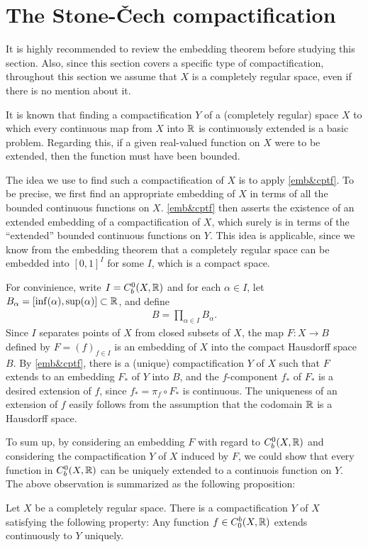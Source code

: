 \section{The Stone-\v{C}ech compactification}

It is highly recommended to review the embedding theorem before studying this section.
Also, since this section covers a specific type of compactification, throughout this section we assume that $X$ is a completely regular space, even if there is no mention about it.

It is known that finding a compactification $Y$ of a (completely regular) space $X$ to which every continuous map from $X$ into ${\mathbb{R}}$ is continuously extended is a basic problem.
Regarding this, if a given real-valued function on $X$ were to be extended, then the function must have been bounded.

The idea we use to find such a compactification of $X$ is to apply \cref{emb&cptf}.
To be precise, we first find an appropriate embedding of $X$ in terms of all the bounded continuous functions on $X$.
\cref{emb&cptf} then asserts the existence of an extended embedding of a compactification of $X$, which surely is in terms of the ``extended'' bounded continuous functions on $Y$.
This idea is applicable, since we know from the embedding theorem that a completely regular space can be embedded into $[0, 1]^I$ for some $I$, which is a compact space.

For convinience, write $I=C_b^0(X, {\mathbb{R}})$ and for each $\alpha\in I$, let $B_\alpha=[\inf(\alpha), \sup(\alpha)]\subset{\mathbb{R}}$, and define
\begin{align*}
    B=\prod_{\alpha\in I}B_\alpha.
\end{align*}
Since $I$ separates points of $X$ from closed subsets of $X$, the map $F: X\rightarrow B$ defined by $F=(f)_{f\in I}$ is an embedding of $X$ into the compact Hausdorff space $B$.
By \cref{emb&cptf}, there is a (unique) compactification $Y$ of $X$ such that $F$ extends to an embedding $F_*$ of $Y$ into $B$, and the $f$-component $f_*$ of $F_*$ is a desired extension of $f$, since $f_*=\pi_f\circ F_*$ is continuous.
The uniqueness of an extension of $f$ easily follows from the assumption that the codomain ${\mathbb{R}}$ is a Hausdorff space.

To sum up, by considering an embedding $F$ with regard to $C_b^0(X, {\mathbb{R}})$ and considering the compactification $Y$ of $X$ induced by $F$, we could show that every function in $C_b^0(X, {\mathbb{R}})$ can be uniquely extended to a continuois function on $Y$.
The above observation is summarized as the following proposition:
\begin{prop}\label{SC-cptf_ver1}
    Let $X$ be a completely regular space.
    There is a compactification $Y$ of $X$ satisfying the following property:
    Any function $f\in C_0^b(X, {\mathbb{R}})$ extends continuously to $Y$ uniquely.
\end{prop}

